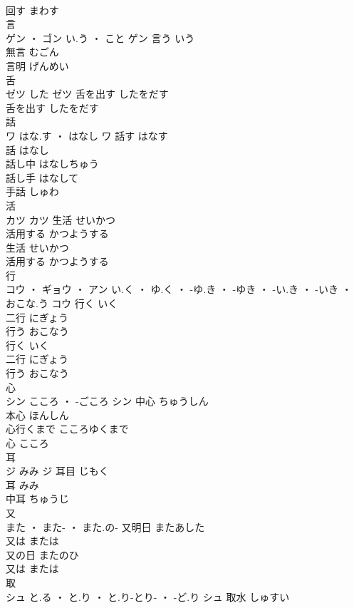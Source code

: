 \documentclass[8pt]{extreport}
\begin{document}
\begin{CJK}{UTF8}{min}
\\	回す	まわす	
\\	言	
\\	ゲン ・ ゴン	い.う ・ こと	ゲン	言う	いう	
\\	無言	むごん	
\\	言明	げんめい	
\\	舌	
\\	ゼツ	した	ゼツ	舌を出す	したをだす	
\\	舌を出す	したをだす	
\\	話	
\\	ワ	はな.す ・ はなし	ワ	話す	はなす	
\\	話	はなし	
\\	話し中	はなしちゅう	
\\	話し手	はなして	
\\	手話	しゅわ	
\\	活	
\\	カツ		カツ	生活	せいかつ	
\\	活用する	かつようする	
\\	生活	せいかつ	
\\	活用する	かつようする	
\\	行	
\\	コウ ・ ギョウ ・ アン	い.く ・ ゆ.く ・ -ゆ.き ・ -ゆき ・ -い.き ・ -いき ・ おこな.う	コウ	行く	いく	
\\	二行	にぎょう	
\\	行う	おこなう	
\\	行く	いく	
\\	二行	にぎょう	
\\	行う	おこなう	
\\	心	
\\	シン	こころ ・ -ごころ	シン	中心	ちゅうしん	
\\	本心	ほんしん	
\\	心行くまで	こころゆくまで	
\\	心	こころ	
\\	耳	
\\	ジ	みみ	ジ	耳目	じもく	
\\	耳	みみ	
\\	中耳	ちゅうじ	
\\	又	
\\	また ・ また- ・ また.の-		又明日	またあした	
\\	又は	または	
\\	又の日	またのひ	
\\	又は	または	
\\	取	
\\	シュ	と.る ・ と.り ・ と.り-とり- ・ -ど.り	シュ													取水	しゅすい	

\end{CJK}
\end{document}
